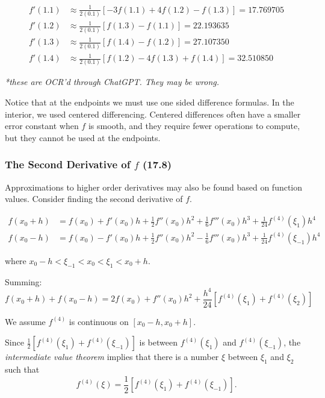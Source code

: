 \documentclass[12pt]{article}
\begin{document}
\begin{align*}
    f'(1.1) &\approx \frac{1}{2(0.1)} \left[ -3f(1.1) + 4f(1.2) - f(1.3) \right] = 17.769705 \\[10pt]
    f'(1.2) &\approx \frac{1}{2(0.1)} \left[ f(1.3) - f(1.1) \right] = 22.193635 \\[10pt]
    f'(1.3) &\approx \frac{1}{2(0.1)} \left[ f(1.4) - f(1.2) \right] = 27.107350 \\[10pt]
    f'(1.4) &\approx \frac{1}{2(0.1)} \left[ f(1.2) - 4f(1.3) + f(1.4) \right] = 32.510850
\end{align*}

\textit{*these are OCR'd through ChatGPT. They may be wrong.}

Notice that at the endpoints we must use one sided difference formulas. In the
interior, we used centered differencing. Centered differences often have a
smaller error constant when $f$ is smooth, and they require fewer operations to
compute, but they cannot be used at the endpoints.

\subsubsection{The Second Derivative of $f$ (17.8)}\label{sec:second_derivative_approximation}
Approximations to higher order derivatives may also be found based on function
values. Consider finding the second derivative of $f$.

\begin{align*}
    f(x_0 + h) &= f(x_0) + f'(x_0) h + \frac{1}{2} f''(x_0) h^2 + \frac{1}{6}
    f'''(x_0) h^3 + \frac{1}{24} f^{(4)}(\xi_1) h^4 \\
    f(x_0 - h) &= f(x_0) - f'(x_0) h + \frac{1}{2} f''(x_0) h^2 - \frac{1}{6}
    f'''(x_0) h^3 + \frac{1}{24} f^{(4)}(\xi_{-1}) h^4
\end{align*}

\noindent where \( x_0 - h < \xi_{-1} < x_0 < \xi_{1} < x_0 + h \).

Summing:
\begin{equation}
    f(x_0 + h) + f(x_0 - h) = 2f(x_0) + f''(x_0) h^2 + \frac{h^4}{24} \left[ f^{(4)}(\xi_1) + f^{(4)}(\xi_2) \right]
    \label{eq:second_derivative_approximation}
\end{equation}

We assume \( f^{(4)} \) is continuous on \( [x_0 - h, x_0 + h] \).

Since
\(
\displaystyle\frac{1}{2} \left[ f^{(4)}(\xi_1) + f^{(4)}(\xi_{-1}) \right]
\)
is between \( f^{(4)}(\xi_1) \) and \( f^{(4)}(\xi_{-1}) \), the 
\textit{intermediate value theorem} implies that there is a number
\( \xi \) between \( \xi_1 \) and \( \xi_2 \) such that
\[
  f^{(4)}(\xi) = \frac{1}{2} \left[ f^{(4)}(\xi_1) + f^{(4)}(\xi_{-1}) \right].
\]
\end{document}
